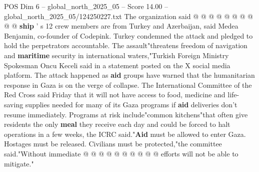 \begin{textsample}{POS Dim 6 – global\_north\_2025\_05 – Score 14.00 – global\_north\_2025\_05/124250227.txt}
The organization said @ @ @ @ @ @ @ @ @ @ \textbf{ship} ' s 12 crew members are from Turkey and Azerbaijan, said Medea Benjamin, co-founder of Codepink.
Turkey condemned the attack and pledged to hold the perpetrators accountable.
The assault"threatens freedom of navigation and \textbf{maritime} security in international waters,"Turkish Foreign Ministry Spokesman Oncu Keceli said in a statement posted on the X social media platform.
The attack happened as \textbf{aid} groups have warned that the humanitarian response in Gaza is on the verge of collapse.
The International Committee of the Red Cross said Friday that it will not have access to food, medicine and life-saving supplies needed for many of its Gaza programs if \textbf{aid} deliveries don't resume immediately.
Programs at risk include"common kitchens"that often give residents the only \textbf{meal} they receive each day and could be forced to halt operations in a few weeks, the ICRC said."\textbf{Aid} must be allowed to enter Gaza.
Hostages must be released.
Civilians must be protected,"the committee said."Without immediate @ @ @ @ @ @ @ @ @ @ efforts will not be able to mitigate."

\end{textsample}
